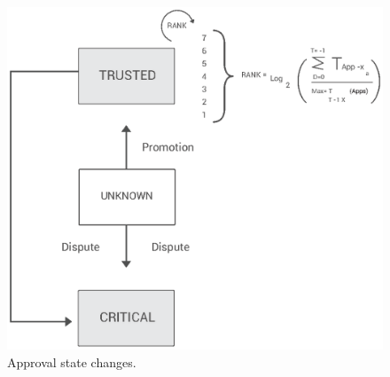 


\begin{figure}[!ht]
\centering
\includegraphics[width=\textwidth]{diagrams/approval_state_diagram.eps}
\caption{Approval state changes.}
\label{fig:approval_state_diagram}
\end{figure}


